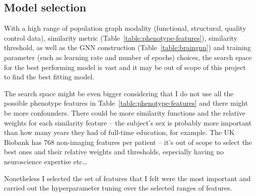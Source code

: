 \subsection{Model selection}

With a high range of population graph modality (functional, structural, quality control data), similarity metric (Table~\ref{table:phenotype-features}), similarity threshold, as well as the GNN construction (Table~\ref{table:braingnn}) and training parameter (such as learning rate and number of epochs) choices, the search space for the best performing model is vast and it may be out of scope of this project to find the best fitting model.

The search space might be even bigger considering that I do not use all the possible phenotype features in Table~\ref{table:phenotype-features} and there might be more confounders. There could be more similarity functions and the relative weights for each similarity feature – the subject's sex is probably more important than how many years they had of full-time education, for example. The UK Biobank has 768 non-imaging features per patient – it's out of scope to select the best ones and their relative weights and thresholds, especially having no neuroscience expertise etc\dots


Nonetheless I selected the set of features that I felt were the most important and carried out the hyperparameter tuning over the selected ranges of features.

